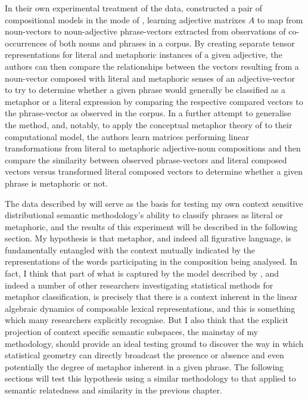 In their own experimental treatment of the data, \citeauthor{GutierrezEA2016} constructed a pair of compositional models in the mode of \cite{BaroniEA2010}, learning adjective matrixes $A$ to map from noun-vectors to noun-adjective phrase-vectors extracted from observations of co-occurrences of both nouns and phrases in a corpus.  By creating separate tensor representations for literal and metaphoric instances of a given adjective, the authors can then compare the relationships between the vectors resulting from a noun-vector composed with literal and metaphoric senses of an adjective-vector to try to determine whether a given phrase would generally be classified as a metaphor or a literal expression by comparing the respective compared vectors to the phrase-vector as observed in the corpus.  In a further attempt to generalise the method, and, notably, to apply the conceptual metaphor theory of \cite{LakoffEA1980} to their computational model, the authors learn matrices performing linear transformations from literal to metaphoric adjective-noun compositions and then compare the similarity between observed phrase-vectors and literal composed vectors versus transformed literal composed vectors to determine whether a given phrase is metaphoric or not.

The data described by \citeauthor{GutierrezEA2016} will serve as the basis for testing my own context sensitive distributional semantic methodology's ability to classify phrases as literal or metaphoric, and the results of this experiment will be described in the following section.  My hypothesis is that metaphor, and indeed all figurative language, is fundamentally entangled with the context mutually indicated by the representations of the words participating in the composition being analysed.  In fact, I think that part of what is captured by the model described by \citeauthor{GutierrezEA2016}, and indeed a number of other researchers investigating statistical methods for metaphor classification, is precisely that there is a context inherent in the linear algebraic dynamics of composable lexical representations, and this is something which many researchers explicitly recognise.  But I also think that the explicit projection of context specific semantic subspaces, the mainstay of my methodology, should provide an ideal testing ground to discover the way in which statistical geometry can directly broadcast the presence or absence and even potentially the degree of metaphor inherent in a given phrase.  The following sections will test this hypothesis using a similar methodology to that applied to semantic relatedness and similarity in the previous chapter.

